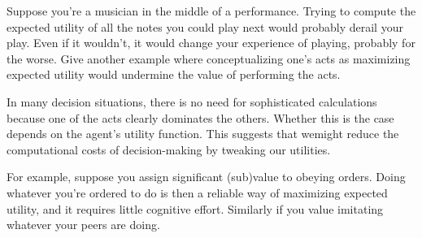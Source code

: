 
%

\begin{exercise}{1}
  Suppose you're a musician in the middle of a performance. Trying to compute
  the expected utility of all the notes you could play next would probably
  derail your play. Even if it wouldn't, it would change your experience of
  playing, probably for the worse. Give another example where conceptualizing
  one's acts as maximizing expected utility would undermine the value of
  performing the acts.
\end{exercise}

In many decision situations, there is no need for sophisticated calculations
because one of the acts clearly dominates the others. Whether this is the case
depends on the agent's utility function. This suggests that wemight reduce the
computational costs of decision-making by tweaking our utilities.

For example, suppose you assign significant (sub)value to obeying orders. Doing
whatever you're ordered to do is then a reliable way of maximizing expected
utility, and it requires little cognitive effort. Similarly if you value
imitating whatever your peers are doing.



